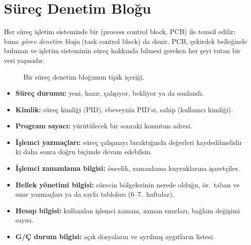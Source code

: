 \section{Süreç Denetim Bloğu}
\label{sec:pcb}

Her süreç işletim sisteminde bir  (process control block, PCB) ile temsil edilir; buna \emph{görev denetim bloğu} (task control block) da denir. PCB, çekirdek belleğinde bulunan ve işletim sisteminin süreç hakkında bilmesi gereken her şeyi tutan bir veri yapısıdır.

\begin{figure}[H]
\centering
{}
\caption{Bir süreç denetim bloğunun tipik içeriği.}
\end{figure}

\begin{itemize}
  \item \textbf{Süreç durumu:} yeni, hazır, çalışıyor, bekliyor ya da sonlandı.
  \item \textbf{Kimlik:} süreç kimliği (PID), ebeveynin PID'si, sahip (kullanıcı kimliği).
  \item \textbf{Program sayacı:} yürütülecek bir sonraki komutun adresi.
  \item \textbf{İşlemci yazmaçları:} süreç çalışmayı bıraktığında değerleri kaydedilmelidir ki daha sonra doğru biçimde devam edebilsin.
  \item \textbf{İşlemci zamanlama bilgisi:} öncelik, zamanlama kuyruklarına işaretçiler.
  \item \textbf{Bellek yönetimi bilgisi:} sürecin bölgelerinin nerede olduğu, ör.\ taban ve sınır yazmaçları ya da sayfa tabloları (6--7.~haftalar).
  \item \textbf{Hesap bilgisi:} kullanılan işlemci zamanı, zaman sınırları, bağlam değişimi sayısı.
  \item \textbf{G/Ç durum bilgisi:} açık dosyaların ve ayrılmış aygıtların listesi.
\end{itemize}

